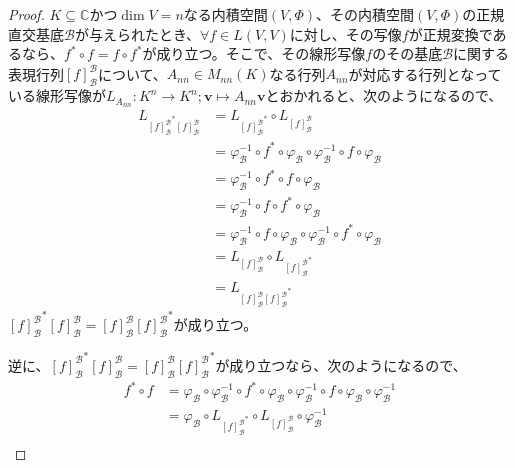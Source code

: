 \documentclass[dvipdfmx]{jsarticle}
\begin{document}
\begin{proof}
$K \subseteq \mathbb{C}$かつ$\dim V = n$なる内積空間$(V,\varPhi)$、その内積空間$(V,\varPhi)$の正規直交基底$\mathcal{B}$が与えられたとき、$\forall f \in L(V,V)$に対し、その写像$f$が正規変換であるなら、$f^{*} \circ f = f \circ f^{*}$が成り立つ。そこで、その線形写像$f$のその基底$\mathcal{B}$に関する表現行列$[ f]_{\mathcal{B}}^{\mathcal{B}}$について、$A_{nn} \in M_{nn}(K)$なる行列$A_{nn}$が対応する行列となっている線形写像が$L_{A_{nn}}:K^{n} \rightarrow K^{n};\mathbf{v} \mapsto A_{nn}\mathbf{v}$とおかれると、次のようになるので、
\begin{align*}
L_{{[ f]_{\mathcal{B}}^{\mathcal{B}}}^{*}[ f]_{\mathcal{B}}^{\mathcal{B}}} &= L_{{[ f]_{\mathcal{B}}^{\mathcal{B}}}^{*}} \circ L_{[ f]_{\mathcal{B}}^{\mathcal{B}}}\\
&= \varphi_{\mathcal{B}}^{- 1} \circ f^{*} \circ \varphi_{\mathcal{B}} \circ \varphi_{\mathcal{B}}^{- 1} \circ f \circ \varphi_{\mathcal{B}}\\
&= \varphi_{\mathcal{B}}^{- 1} \circ f^{*} \circ f \circ \varphi_{\mathcal{B}}\\
&= \varphi_{\mathcal{B}}^{- 1} \circ f \circ f^{*} \circ \varphi_{\mathcal{B}}\\
&= \varphi_{\mathcal{B}}^{- 1} \circ f \circ \varphi_{\mathcal{B}} \circ \varphi_{\mathcal{B}}^{- 1} \circ f^{*} \circ \varphi_{\mathcal{B}}\\
&= L_{[ f]_{\mathcal{B}}^{\mathcal{B}}} \circ L_{{[ f]_{\mathcal{B}}^{\mathcal{B}}}^{*}}\\
&= L_{[ f]_{\mathcal{B}}^{\mathcal{B}}{[ f]_{\mathcal{B}}^{\mathcal{B}}}^{*}}
\end{align*}
${[ f]_{\mathcal{B}}^{\mathcal{B}}}^{*}[ f]_{\mathcal{B}}^{\mathcal{B}} = [ f]_{\mathcal{B}}^{\mathcal{B}}{[ f]_{\mathcal{B}}^{\mathcal{B}}}^{*}$が成り立つ。\par
逆に、${[ f]_{\mathcal{B}}^{\mathcal{B}}}^{*}[ f]_{\mathcal{B}}^{\mathcal{B}} = [ f]_{\mathcal{B}}^{\mathcal{B}}{[ f]_{\mathcal{B}}^{\mathcal{B}}}^{*}$が成り立つなら、次のようになるので、
\begin{align*}
f^{*} \circ f &= \varphi_{\mathcal{B}} \circ \varphi_{\mathcal{B}}^{- 1} \circ f^{*} \circ \varphi_{\mathcal{B}} \circ \varphi_{\mathcal{B}}^{- 1} \circ f \circ \varphi_{\mathcal{B}} \circ \varphi_{\mathcal{B}}^{- 1}\\
&= \varphi_{\mathcal{B}} \circ L_{{[ f]_{\mathcal{B}}^{\mathcal{B}}}^{*}} \circ L_{[ f]_{\mathcal{B}}^{\mathcal{B}}} \circ \varphi_{\mathcal{B}}^{- 1}\\

\end{align*}
\end{proof}
\end{document}

